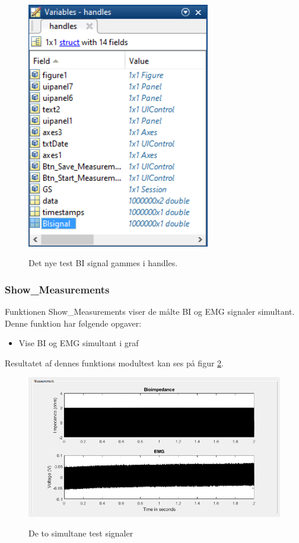\begin{figure}[H] 
\centering
{\includegraphics[width=8cm]
{Figure/modultestprocesshandles}}
\caption{Det nye test BI signal gammes i handles.}
\label{fig:modultestprocesshandles}
\end{figure}







\subsubsection{Show\_Measurements} 

Funktionen Show\_Measurements viser de målte BI og EMG signaler simultant. Denne funktion har følgende opgaver:
\begin{itemize}
\item Vise BI og EMG simultant i graf
\end{itemize}

Resultatet af dennes funktions modultest kan ses på figur \ref{fig:modultestshow}.




\begin{figure}[H] 
\centering
{\includegraphics[width=\linewidth]
{Figure/modultestshow}}
\caption{De to simultane test signaler}
\label{fig:modultestshow}
\end{figure}



